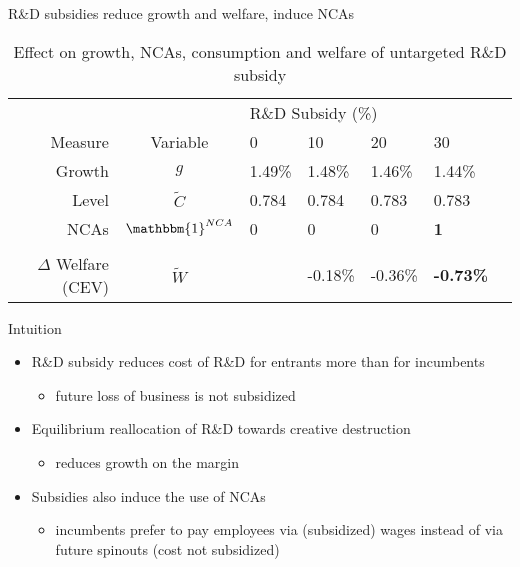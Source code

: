 \documentclass[english,usenames,dvipsnames]{beamer}
\begin{document}
\begin{frame}{R\&D subsidies reduce growth and welfare, induce NCAs}\label{RDsubsidy_table}
		\begin{table}
			\centering
			\small
			\caption*{Effect on growth, NCAs, consumption and welfare of untargeted R\&D subsidy}
			\begin{tabular}{rclllll}
				\toprule \toprule
				 &  & \multicolumn{4}{l}{R\&D Subsidy (\%)} \vspace{3pt} \tabularnewline
				Measure &Variable & 0 & 10 & 20 & 30 \tabularnewline
				\midrule
				Growth & $g$ & 1.49\% & 1.48\% & 1.46\% & 1.44\% \tabularnewline
				Level & $\tilde{C}$  & 0.784 &  0.784 & 0.783 & 0.783 \tabularnewline 
				NCAs & $\mathbbm{1}^{NCA}$ & 0 & 0 & 0 & \alert{\textbf{1}} \tabularnewline
				\tabularnewline
				$\Delta$ Welfare (CEV) & $\tilde{W}$  &  & -0.18\% & -0.36\% & \alert{\textbf{-0.73\%}} \tabularnewline
				\bottomrule
			\end{tabular}
		\end{table}
		\hyperlink{rd_subsidies:decomposition_growth_decrease}{}
		\hyperlink{plots:rd_subsidies1}{}
		\hyperlink{plots:rd_subsidies2}{}
\end{frame}

\begin{frame}{Intuition}
	\begin{itemize}
		\item <+-> R\&D subsidy reduces cost of R\&D for entrants more than for incumbents
		\begin{itemize}
			\item future loss of business is not subsidized
		\end{itemize}
		\medskip
		\item <+-> Equilibrium reallocation of R\&D towards creative destruction
		\begin{itemize}
			\item reduces growth on the margin
		\end{itemize}
		\medskip
		\item <+-> Subsidies also induce the use of NCAs
		\begin{itemize}
			\item incumbents prefer to pay employees via (subsidized) wages instead of via future spinouts (cost not subsidized)
		\end{itemize}
	\end{itemize}
\end{frame}
\end{document}
